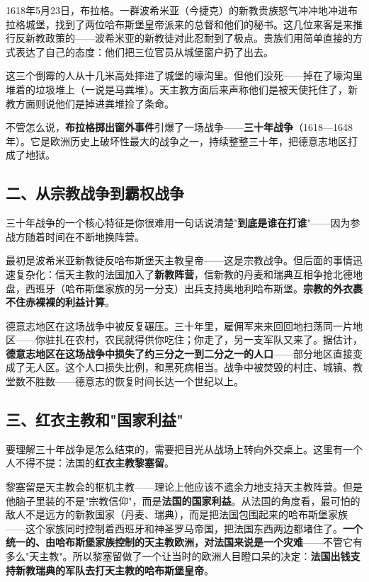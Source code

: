 \documentclass[a4paper,12pt]{ctexart}
\begin{document}
1618年5月23日，布拉格。一群波希米亚（今捷克）的新教贵族怒气冲冲地冲进布拉格城堡，找到了两位哈布斯堡皇帝派来的总督和他们的秘书。这几位来客是来推行反新教政策的——波希米亚的新教徒对此忍耐到了极点。贵族们用简单直接的方式表达了自己的态度：他们把三位官员从城堡窗户扔了出去。

这三个倒霉的人从十几米高处摔进了城堡的壕沟里。但他们没死——掉在了壕沟里堆着的垃圾堆上（一说是马粪堆）。天主教方面后来声称他们是被天使托住了，新教方面则说他们是掉进粪堆捡了条命。

不管怎么说，\textbf{布拉格掷出窗外事件}引爆了一场战争——\textbf{三十年战争}（1618—1648年）。它是欧洲历史上破坏性最大的战争之一，持续整整三十年，把德意志地区打成了地狱。

\subsection*{二、从宗教战争到霸权战争}

三十年战争的一个核心特征是你很难用一句话说清楚"\textbf{到底是谁在打谁}"——因为参战方随着时间在不断地换阵营。

最初是波希米亚新教徒反哈布斯堡天主教皇帝——这是宗教战争。但后面的事情迅速复杂化：信天主教的法国加入了\textbf{新教阵营}，信新教的丹麦和瑞典互相争抢北德地盘，西班牙（哈布斯堡家族的另一分支）出兵支持奥地利哈布斯堡。\textbf{宗教的外衣裹不住赤裸裸的利益计算}。

德意志地区在这场战争中被反复碾压。三十年里，雇佣军来来回回地扫荡同一片地区——你驻扎在农村，农民就得供你吃住；你走了，另一支军队又来了。据估计，\textbf{德意志地区在这场战争中损失了约三分之一到二分之一的人口}——部分地区直接变成了无人区。这个人口损失比例，和黑死病相当。战争中被焚毁的村庄、城镇、教堂数不胜数——德意志的恢复时间长达一个世纪以上。

\subsection*{三、红衣主教和"国家利益"}

要理解三十年战争是怎么结束的，需要把目光从战场上转向外交桌上。这里有一个人不得不提：法国的\textbf{红衣主教黎塞留}。

黎塞留是天主教会的枢机主教——理论上他应该不遗余力地支持天主教阵营。但是他脑子里装的不是"宗教信仰"，而是\textbf{法国的国家利益}。从法国的角度看，最可怕的敌人不是远方的新教国家（丹麦、瑞典），而是把法国包围起来的哈布斯堡家族——这个家族同时控制着西班牙和神圣罗马帝国，把法国东西两边都堵住了。\textbf{一个统一的、由哈布斯堡家族控制的天主教欧洲，对法国来说是一个灾难}——不管它有多么"天主教"。所以黎塞留做了一个让当时的欧洲人目瞪口呆的决定：\textbf{法国出钱支持新教瑞典的军队去打天主教的哈布斯堡皇帝}。
\end{document}
